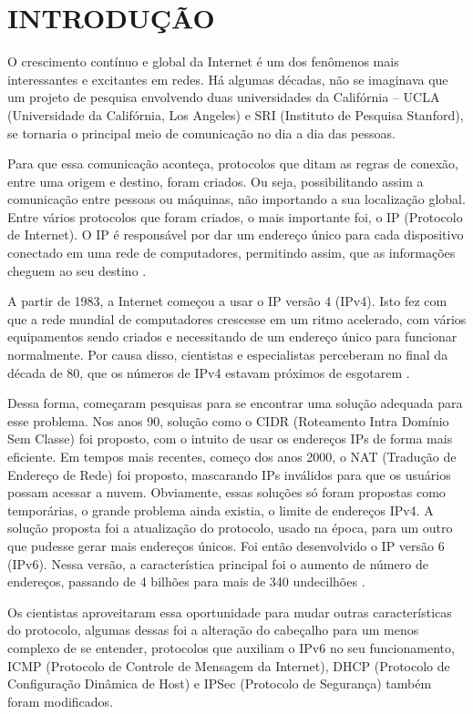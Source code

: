 \chapter{INTRODUÇÃO}\label{ch:introducao}

O crescimento contínuo e global da Internet é um dos fenômenos mais interessantes e excitantes em redes. Há algumas décadas, não se imaginava que um projeto de pesquisa envolvendo duas universidades da Califórnia – UCLA (Universidade da Califórnia, Los Angeles) e SRI (Instituto de Pesquisa Stanford), se tornaria o principal meio de comunicação no dia a dia das pessoas.

Para que essa comunicação aconteça, protocolos que ditam as regras de conexão, entre uma origem e destino, foram criados. Ou seja, possibilitando assim a comunicação entre pessoas ou máquinas, não importando a sua localização global. Entre vários protocolos que foram criados, o mais importante foi, o IP (Protocolo de Internet). O IP é responsável por dar um endereço único para cada dispositivo conectado em uma rede de computadores, permitindo assim, que as informações cheguem ao seu destino \cite{ip}. 

A partir de 1983, a Internet começou a usar o IP versão 4 (IPv4). Isto fez com que a rede mundial de computadores crescesse em um ritmo acelerado, com vários equipamentos sendo criados e necessitando de um endereço único para funcionar normalmente. Por causa disso, cientistas e especialistas perceberam no final da década de 80, que os números de IPv4 estavam próximos de esgotarem \cite{desafio-ipv6}.

Dessa forma, começaram pesquisas para se encontrar uma solução adequada para esse problema. Nos anos 90, solução como o CIDR (Roteamento Intra Domínio Sem Classe) foi proposto, com o intuito de usar os endereços IPs de forma mais eficiente. Em tempos mais recentes, começo dos anos 2000, o NAT (Tradução de Endereço de Rede) foi proposto, mascarando IPs inválidos para que os usuários possam acessar a nuvem. Obviamente, essas soluções só foram propostas como temporárias, o grande problema ainda existia, o limite de endereços IPv4.
A solução proposta foi a atualização do protocolo, usado na época, para um outro que pudesse gerar mais endereços únicos. Foi então desenvolvido o IP versão 6 (IPv6). Nessa versão, a característica principal foi o aumento de número de endereços, passando de 4 bilhões para mais de 340 undecilhões \cite{tamanho-ipv6}.

Os cientistas aproveitaram essa oportunidade para mudar outras características do protocolo, algumas dessas foi a alteração do cabeçalho para um menos complexo de se entender, protocolos que auxiliam o IPv6 no seu funcionamento, ICMP (Protocolo de Controle de Mensagem da Internet), DHCP (Protocolo de Configuração Dinâmica de Host) e IPSec (Protocolo de Segurança) também foram modificados.

